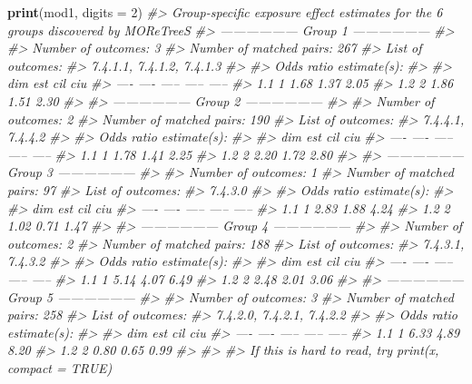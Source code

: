 \documentclass[]{article}
\newenvironment{Shaded}{\begin{snugshade}}{\end{snugshade}}
\newcommand{\CommentTok}[1]{\textcolor[rgb]{0.56,0.35,0.01}{\textit{#1}}}
\newcommand{\DataTypeTok}[1]{\textcolor[rgb]{0.13,0.29,0.53}{#1}}
\newcommand{\DecValTok}[1]{\textcolor[rgb]{0.00,0.00,0.81}{#1}}
\newcommand{\KeywordTok}[1]{\textcolor[rgb]{0.13,0.29,0.53}{\textbf{#1}}}
\newcommand{\NormalTok}[1]{#1}
\begin{document}
\begin{Shaded}
\begin{Highlighting}[]
\KeywordTok{print}\NormalTok{(mod1, }\DataTypeTok{digits =} \DecValTok{2}\NormalTok{)}
\CommentTok{#> Group-specific exposure effect estimates for the 6 groups discovered by MOReTreeS}
\CommentTok{#> ------------------ Group 1 ------------------}
\CommentTok{#> }
\CommentTok{#> Number of outcomes: 3 }
\CommentTok{#> Number of matched pairs: 267 }
\CommentTok{#> List of outcomes:}
\CommentTok{#> 7.4.1.1, 7.4.1.2, 7.4.1.3 }
\CommentTok{#> }
\CommentTok{#> Odds ratio estimate(s):}
\CommentTok{#> }
\CommentTok{#>        dim    est    cil    ciu}
\CommentTok{#> ----  ----  -----  -----  -----}
\CommentTok{#> 1.1      1   1.68   1.37   2.05}
\CommentTok{#> 1.2      2   1.86   1.51   2.30}
\CommentTok{#> }
\CommentTok{#> ------------------ Group 2 ------------------}
\CommentTok{#> }
\CommentTok{#> Number of outcomes: 2 }
\CommentTok{#> Number of matched pairs: 190 }
\CommentTok{#> List of outcomes:}
\CommentTok{#> 7.4.4.1, 7.4.4.2 }
\CommentTok{#> }
\CommentTok{#> Odds ratio estimate(s):}
\CommentTok{#> }
\CommentTok{#>        dim    est    cil    ciu}
\CommentTok{#> ----  ----  -----  -----  -----}
\CommentTok{#> 1.1      1   1.78   1.41   2.25}
\CommentTok{#> 1.2      2   2.20   1.72   2.80}
\CommentTok{#> }
\CommentTok{#> ------------------ Group 3 ------------------}
\CommentTok{#> }
\CommentTok{#> Number of outcomes: 1 }
\CommentTok{#> Number of matched pairs: 97 }
\CommentTok{#> List of outcomes:}
\CommentTok{#> 7.4.3.0 }
\CommentTok{#> }
\CommentTok{#> Odds ratio estimate(s):}
\CommentTok{#> }
\CommentTok{#>        dim    est    cil    ciu}
\CommentTok{#> ----  ----  -----  -----  -----}
\CommentTok{#> 1.1      1   2.83   1.88   4.24}
\CommentTok{#> 1.2      2   1.02   0.71   1.47}
\CommentTok{#> }
\CommentTok{#> ------------------ Group 4 ------------------}
\CommentTok{#> }
\CommentTok{#> Number of outcomes: 2 }
\CommentTok{#> Number of matched pairs: 188 }
\CommentTok{#> List of outcomes:}
\CommentTok{#> 7.4.3.1, 7.4.3.2 }
\CommentTok{#> }
\CommentTok{#> Odds ratio estimate(s):}
\CommentTok{#> }
\CommentTok{#>        dim    est    cil    ciu}
\CommentTok{#> ----  ----  -----  -----  -----}
\CommentTok{#> 1.1      1   5.14   4.07   6.49}
\CommentTok{#> 1.2      2   2.48   2.01   3.06}
\CommentTok{#> }
\CommentTok{#> ------------------ Group 5 ------------------}
\CommentTok{#> }
\CommentTok{#> Number of outcomes: 3 }
\CommentTok{#> Number of matched pairs: 258 }
\CommentTok{#> List of outcomes:}
\CommentTok{#> 7.4.2.0, 7.4.2.1, 7.4.2.2 }
\CommentTok{#> }
\CommentTok{#> Odds ratio estimate(s):}
\CommentTok{#> }
\CommentTok{#>        dim    est    cil    ciu}
\CommentTok{#> ----  ----  -----  -----  -----}
\CommentTok{#> 1.1      1   6.33   4.89   8.20}
\CommentTok{#> 1.2      2   0.80   0.65   0.99}
\CommentTok{#> }
\CommentTok{#> }
\CommentTok{#> If this is hard to read, try print(x, compact = TRUE)}
\end{Highlighting}
\end{Shaded}
\end{document}
